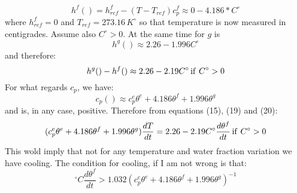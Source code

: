\begin{equation}
h^f() = h^f_{ref} -(T-T_{ref})c_p^f \approx 0 - 4.186*  C^\circ   
\end{equation}
where \(h_{ref}^f=0\) and \(T_{ref} = 273.16\, K^\circ\) so that temperature is now measured in centigrades. Assume also \(C^\circ >0 \).
At the same time for \(g\) is 
\begin{equation}
h^g( ) \approx 2.26  - 1.996 C^\circ
\end{equation}
and therefore:
\begin{equation}
h^g()-h^f() \approx 2.26 - 2.19 C^\circ \, {\rm if}\ C^\circ > 0
\end{equation}
For what regards \( c_p\), we have:
\begin{equation}
c_p() \approx c_p^e \theta^e + 4.186 \theta^f + 1.996 \theta^g
\end{equation}
and is, in any case, positive.
Therefore from equations (15), (19) and (20):
\begin{equation}
(c_p^e \theta^e + 4.186 \theta^f + 1.996 \theta^g) \frac{dT}{dt} = 2.26 - 2.19 C^\circ \frac{d\theta^f}{dt}\, {\rm if}\ C^\circ > 0
\end{equation}
This wold imply that not for any temperature and water fraction variation we have cooling. The condition for cooling, if I am not wrong is that:
\begin{equation}
 ^\circ C \frac{d\theta^f}{dt} > 1.032 (c_p^e \theta^e + 4.186 \theta^f + 1.996 \theta^g)^{-1}
\end{equation}